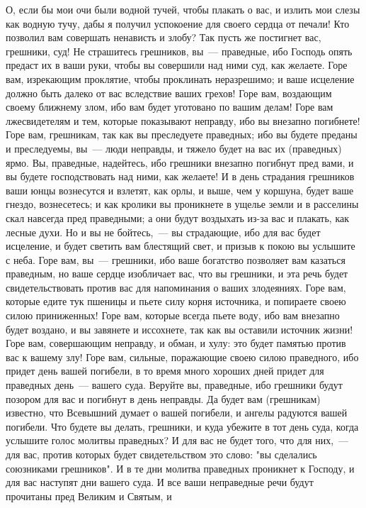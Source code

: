 О, если бы мои очи были водной тучей, чтобы плакать о вас, и
излить мои слезы как водную тучу, дабы я получил успокоение для своего сердца
от печали!
Кто позволил вам совершать ненависть и злобу?
Так пусть же постигнет вас, грешники, суд!
Не страшитесь грешников, вы~--- праведные, ибо Господь опять предаст их
в ваши руки, чтобы вы совершили над ними суд, как желаете.
Горе вам, изрекающим проклятие, чтобы проклинать неразрешимо; и ваше
исцеление должно быть далеко от вас вследствие ваших грехов!
Горе вам, воздающим своему ближнему злом, ибо вам будет уготовано по
вашим делам!
Горе вам лжесвидетелям и тем, которые показывают неправду, ибо вы
внезапно погибнете!
Горе вам, грешникам, так как вы преследуете праведных; ибо вы будете
преданы и преследуемы, вы~--- люди неправды, и тяжело будет на вас их (праведных)
ярмо.
Вы, праведные, надейтесь, ибо грешники внезапно погибнут пред
вами, и вы будете господствовать над ними, как желаете!
И в день страдания грешников ваши юнцы вознесутся и взлетят, как орлы,
и выше, чем у коршуна, будет ваше гнездо, вознесетесь; и как кролики вы
проникнете в ущелье земли и в расселины скал навсегда пред праведными; а они
будут воздыхать из-за вас и плакать, как лесные духи.
Но и вы не бойтесь,~--- вы страдающие, ибо для вас будет исцеление, и
будет светить вам блестящий свет, и призыв к покою вы услышите с неба.
Горе вам, вы~--- грешники, ибо ваше богатство позволяет вам казаться
праведным, но ваше сердце изобличает вас, что вы грешники, и эта речь будет
свидетельствовать против вас для напоминания о ваших злодеяниях.
Горе вам, которые едите тук пшеницы и пьете силу корня источника, и
попираете своею силою приниженных!
Горе вам, которые всегда пьете воду, ибо вам внезапно будет воздано, и
вы завянете и иссохнете, так как вы оставили источник жизни!
Горе вам, совершающим неправду, и обман, и хулу: это будет памятью
против вас к вашему злу!
Горе вам, сильные, поражающие своею силою праведного, ибо придет день
вашей погибели, в то время много хороших дней придет для праведных день~---
вашего суда.
Веруйте вы, праведные, ибо грешники будут позором для вас и
погибнут в день неправды.
Да будет вам (грешникам) известно, что Всевышний думает о вашей
погибели, и ангелы радуются вашей погибели.
Что будете вы делать, грешники, и куда убежите в тот день суда, когда
услышите голос молитвы праведных?
И для вас не будет того, что для них,~--- для вас, против которых будет
свидетельством это слово: "вы сделались союзниками грешников".
И в те дни молитва праведных проникнет к Господу, и для вас наступят
дни вашего суда.
И все ваши неправедные речи будут прочитаны пред Великим и Святым, и
